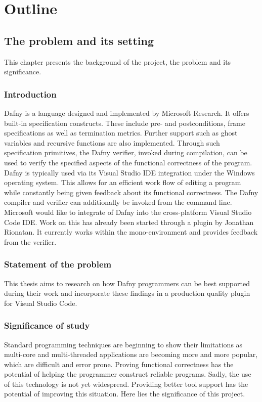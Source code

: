 \section{Outline}
\subsection{The problem and its setting}
This chapter presents the background of the project, the problem and its significance.
\subsubsection{Introduction}
Dafny is a language designed and implemented by Microsoft Research. It offers built-in specification constructs. These include pre- and postconditions, frame specifications as well as termination metrics. Further support such as ghost variables and recursive functions are also implemented. Through such specification primitives, the Dafny verifier, invoked during compilation, can be used to verify the specified aspects of the functional correctness of the program. \newline
Dafny is typically used via its Visual Studio IDE integration under the Windows operating system. This allows for an efficient work flow of editing a program while constantly being given feedback about its functional correctness. The Dafny compiler and verifier can additionally be invoked from the command line. \newline
Microsoft would like to integrate of Dafny into the cross-platform Visual Studio Code IDE. Work on this has already been started through a plugin by Jonathan  Rionatan. It currently works within the mono-environment and provides feedback from the verifier. \newline

\subsubsection{Statement of the problem}
This thesis aims to research on how Dafny programmers can be best supported during their work and incorporate these findings in a production quality plugin for Visual Studio Code. 
\subsubsection{Significance of study}
Standard programming techniques are beginning to show their limitations as multi-core and multi-threaded applications are becoming more and more popular, which are difficult and error prone.
Proving functional correctness has the potential of helping the programmer construct reliable programs.
Sadly, the use of this technology is not yet widespread. Providing better tool support has the potential of improving this situation. Here lies the significance of this project.
